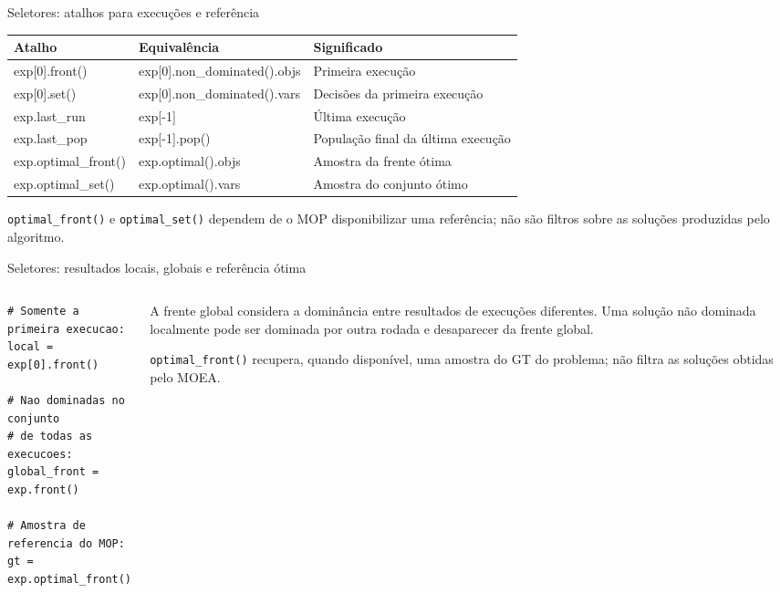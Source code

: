 \begin{frame}{Seletores: atalhos para execuções e referência}
\begin{tabularx}{\linewidth}{@{}>{\ttfamily}p{.33\linewidth}>{\ttfamily}p{.36\linewidth}X@{}}
\textnormal{Atalho} & \textnormal{Equivalência} & \textnormal{Significado}\\\hline
exp[0].front() & exp[0].non\_dominated().objs & Primeira execução\\[9pt]
exp[0].set() & exp[0].non\_dominated().vars & Decisões da primeira execução\\[9pt]
exp.last\_run & exp[-1] & Última execução\\[9pt]
exp.last\_pop & exp[-1].pop() & População final da última execução\\[9pt]
exp.optimal\_front() & exp.optimal().objs & Amostra da frente ótima\\[9pt]
exp.optimal\_set() & exp.optimal().vars & Amostra do conjunto ótimo\\
\end{tabularx}
\vspace{.26cm}
\texttt{optimal\_front()} e \texttt{optimal\_set()} dependem de o MOP disponibilizar uma referência; não são filtros sobre as soluções produzidas pelo algoritmo.
\end{frame}

\begin{frame}[fragile]{Seletores: resultados locais, globais e referência ótima}
\begin{columns}[T,onlytextwidth]
\begin{column}{.49\textwidth}
\begin{lstlisting}[style=python,basicstyle=\ttfamily\fontsize{8}{10}\selectfont]
# Somente a primeira execucao:
local = exp[0].front()

# Nao dominadas no conjunto
# de todas as execucoes:
global_front = exp.front()

# Amostra de referencia do MOP:
gt = exp.optimal_front()
\end{lstlisting}
\end{column}
\begin{column}{.49\textwidth}
A frente global considera a dominância entre resultados de execuções diferentes. Uma solução não dominada localmente pode ser dominada por outra rodada e desaparecer da frente global.
\par\medskip
\texttt{optimal\_front()} recupera, quando disponível, uma amostra do GT do problema; não filtra as soluções obtidas pelo MOEA.
\end{column}
\end{columns}
\end{frame}

